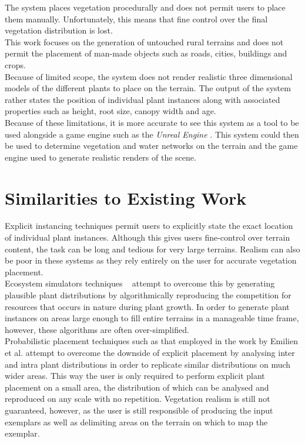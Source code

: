The system places vegetation procedurally and does not permit users to place them manually. Unfortunately, this means that fine control over the final vegetation distribution is lost.\\

This work focuses on the generation of untouched rural terrains and does not permit the placement of man-made objects such as roads, cities, buildings and crops. \\

Because of limited scope, the system does not render realistic three dimensional models of the different plants to place on the terrain. The output of the system rather states the position of individual plant instances along with associated properties such as height, root size, canopy width and age.\\

Because of these limitations, it is more accurate to see this system as a tool to be used alongside a game engine such as the \textit{Unreal Engine} \protect\footnotemark {}. This system could then be used to determine vegetation and water networks on the terrain and the game engine used to generate realistic renders of the scene.

\section{Similarities to Existing Work}

Explicit instancing techniques \cite{Emilien,Deussen1998,Andujar2014} permit users to explicitly state the exact location of individual plant instances. Although this gives users fine-control over terrain content, the task can be long and tedious for very large terrains. Realism can also be poor in these systems as they rely entirely on the user for accurate vegetation placement.\\
Ecosystem simulators techniques ~\cite{Lane2002,Deussen1998} attempt to overcome this by generating plausible plant distributions by algorithmically reproducing the competition for resources that occurs in nature during plant growth. In order to generate plant instances on areas large enough to fill entire terrains in a manageable time frame, however, these algorithms are often over-simplified.\\
Probabilistic placement techniques such as that employed in the work by Emilien et al. \cite{Emilien} attempt to overcome the downside of explicit placement by analysing inter and intra plant distributions in order to replicate similar distributions on much wider areas. This way the user is only required to perform explicit plant placement on a small area, the distribution of which can be analysed and reproduced on any scale with no repetition. Vegetation realism is still not guaranteed, however, as the user is still responsible of producing the input exemplars as well as delimiting areas on the terrain on which to map the exemplar.\\

